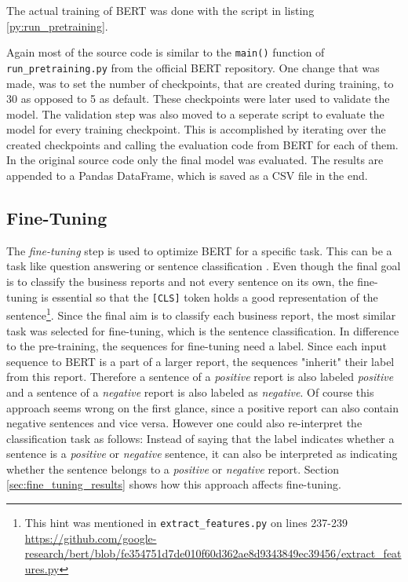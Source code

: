 The actual training of \ac{BERT} was done with the script in listing \ref{py:run_pretraining}.

Again most of the source code is similar to the \texttt{main()} function of \texttt{run\_pretraining.py} from the official \ac{BERT} repository.
One change that was made, was to set the number of checkpoints, that are created during training, to 30 as opposed to 5 as default.
These checkpoints were later used to validate the model.
The validation step was also moved to a seperate script to evaluate the model for every training checkpoint.
This is accomplished by iterating over the created checkpoints and calling the evaluation code from \ac{BERT} for each of them.
In the original source code only the final model was evaluated.
The results are appended to a Pandas DataFrame, which is saved as a \ac{CSV} file in the end.

\subsection{Fine-Tuning}
\label{subsec:fine_tuning}
The \textit{fine-tuning} step is used to optimize \ac{BERT} for a specific task.
This can be a task like question answering or sentence classification \cite[pp. 5-7]{Devlin2018}.
Even though the final goal is to classify the business reports and not every sentence on its own, the fine-tuning is essential so that the \texttt{[CLS]} token holds a good representation of the sentence\footnote{This hint was mentioned in \texttt{extract\_features.py} on lines 237-239 \url{https://github.com/google-research/bert/blob/fe354751d7de010f60d362ae8d9343849ec39456/extract_features.py}}.
Since the final aim is to classify each business report, the most similar task was selected for fine-tuning, which is the sentence classification.
In difference to the pre-training, the sequences for fine-tuning need a label.
Since each input sequence to \ac{BERT} is a part of a larger report, the sequences "inherit" their label from this report.
Therefore a sentence of a \textit{positive} report is also labeled \textit{positive} and a sentence of a \textit{negative} report is also labeled as \textit{negative}.
Of course this approach seems wrong on the first glance, since a positive report can also contain negative sentences and vice versa.
However one could also re-interpret the classification task as follows:
Instead of saying that the label indicates whether a sentence is a \textit{positive} or \textit{negative} sentence, it can also be interpreted as indicating whether the sentence belongs to a \textit{positive} or \textit{negative} report.
Section \ref{sec:fine_tuning_results} shows how this approach affects fine-tuning.

